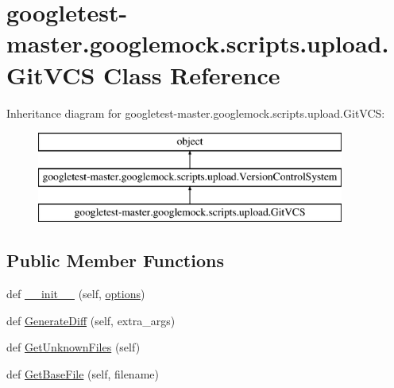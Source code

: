 \hypertarget{classgoogletest-master_1_1googlemock_1_1scripts_1_1upload_1_1_git_v_c_s}{}\section{googletest-\/master.googlemock.\+scripts.\+upload.\+Git\+V\+CS Class Reference}
\label{classgoogletest-master_1_1googlemock_1_1scripts_1_1upload_1_1_git_v_c_s}
Inheritance diagram for googletest-\/master.googlemock.\+scripts.\+upload.\+Git\+V\+CS\+:\begin{figure}[H]
\begin{center}
\leavevmode
\includegraphics[height=3.000000cm]{d2/d2b/classgoogletest-master_1_1googlemock_1_1scripts_1_1upload_1_1_git_v_c_s}
\end{center}
\end{figure}
\subsection*{Public Member Functions}
\begin{DoxyCompactItemize}
\item 
def \mbox{\hyperlink{classgoogletest-master_1_1googlemock_1_1scripts_1_1upload_1_1_git_v_c_s_a432bf6bdc09ac36b3fc46320e4762167}{\+\_\+\+\_\+init\+\_\+\+\_\+}} (self, \mbox{\hyperlink{classgoogletest-master_1_1googlemock_1_1scripts_1_1upload_1_1_version_control_system_a310493168408513d7aac348752afd91d}{options}})
\item 
def \mbox{\hyperlink{classgoogletest-master_1_1googlemock_1_1scripts_1_1upload_1_1_git_v_c_s_a397feccdaf8a14b5fa39e0911e40c282}{Generate\+Diff}} (self, extra\+\_\+args)
\item 
def \mbox{\hyperlink{classgoogletest-master_1_1googlemock_1_1scripts_1_1upload_1_1_git_v_c_s_affcaf406301de58b3b1ff4d91b2b6fae}{Get\+Unknown\+Files}} (self)
\item 
def \mbox{\hyperlink{classgoogletest-master_1_1googlemock_1_1scripts_1_1upload_1_1_git_v_c_s_adfdd00d7335071ff4c5096281c3b1c4f}{Get\+Base\+File}} (self, filename)
\end{DoxyCompactItemize}
